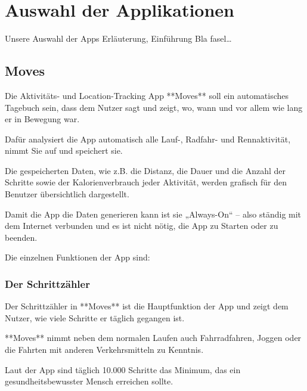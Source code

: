 
\chapter{Auswahl der Applikationen}
\label{ch:Apps}
Unsere Auswahl der Apps
Erläuterung, Einführung
Bla fasel\ldots



\section{Moves}
\label{ch:Apps:sec:Moves}

Die Aktivitäts- und Location-Tracking App **Moves** soll ein automatisches Tagebuch sein, dass dem Nutzer sagt und zeigt, wo, wann und vor allem wie lang er in Bewegung war.

Dafür analysiert die App automatisch alle Lauf-, Radfahr- und Rennaktivität, nimmt Sie auf und speichert sie. 

Die gespeicherten Daten, wie z.B. die Distanz, die Dauer und die Anzahl der Schritte  sowie der Kalorienverbrauch jeder Aktivität, werden grafisch für den Benutzer übersichtlich dargestellt. 

Damit die App die Daten generieren kann ist sie „Always-On“ – also ständig mit dem Internet verbunden und es ist nicht nötig, die App zu Starten oder zu beenden.

Die einzelnen Funktionen der App sind: 

\subsection{Der Schrittzähler}

Der Schrittzähler in **Moves** ist die Hauptfunktion der App und zeigt dem Nutzer, wie viele Schritte er täglich gegangen ist. 

**Moves** nimmt neben dem normalen Laufen auch Fahrradfahren, Joggen oder die Fahrten mit anderen Verkehrsmitteln zu Kenntnis. 

Laut der App sind täglich 10.000 Schritte das Minimum, das ein gesundheitsbewusster Mensch erreichen sollte.

